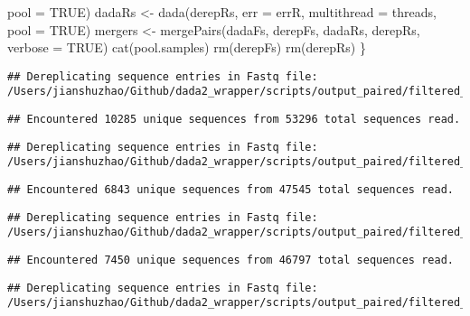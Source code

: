 \documentclass[
]{article}
\newenvironment{Shaded}{\begin{snugshade}}{\end{snugshade}}
\newcommand{\AttributeTok}[1]{\textcolor[rgb]{0.77,0.63,0.00}{#1}}
\newcommand{\ConstantTok}[1]{\textcolor[rgb]{0.00,0.00,0.00}{#1}}
\newcommand{\FunctionTok}[1]{\textcolor[rgb]{0.00,0.00,0.00}{#1}}
\newcommand{\NormalTok}[1]{#1}
\newcommand{\OtherTok}[1]{\textcolor[rgb]{0.56,0.35,0.01}{#1}}
\begin{document}
\begin{Shaded}
\begin{Highlighting}[]
        \AttributeTok{pool =} \ConstantTok{TRUE}\NormalTok{)}
\NormalTok{    dadaRs }\OtherTok{\textless{}{-}} \FunctionTok{dada}\NormalTok{(derepRs, }\AttributeTok{err =}\NormalTok{ errR, }\AttributeTok{multithread =}\NormalTok{ threads, }
        \AttributeTok{pool =} \ConstantTok{TRUE}\NormalTok{)}
\NormalTok{    mergers }\OtherTok{\textless{}{-}} \FunctionTok{mergePairs}\NormalTok{(dadaFs, derepFs, dadaRs, derepRs, }\AttributeTok{verbose =} \ConstantTok{TRUE}\NormalTok{)}
    \FunctionTok{cat}\NormalTok{(pool.samples)}
    \FunctionTok{rm}\NormalTok{(derepFs)}
    \FunctionTok{rm}\NormalTok{(derepRs)}
\NormalTok{\}}
\end{Highlighting}
\end{Shaded}

\begin{verbatim}
## Dereplicating sequence entries in Fastq file: /Users/jianshuzhao/Github/dada2_wrapper/scripts/output_paired/filtered_input/Orwoll_BI0023_BI_F_filt.fastq.gz
\end{verbatim}

\begin{verbatim}
## Encountered 10285 unique sequences from 53296 total sequences read.
\end{verbatim}

\begin{verbatim}
## Dereplicating sequence entries in Fastq file: /Users/jianshuzhao/Github/dada2_wrapper/scripts/output_paired/filtered_input/Orwoll_BI0056_BI_F_filt.fastq.gz
\end{verbatim}

\begin{verbatim}
## Encountered 6843 unique sequences from 47545 total sequences read.
\end{verbatim}

\begin{verbatim}
## Dereplicating sequence entries in Fastq file: /Users/jianshuzhao/Github/dada2_wrapper/scripts/output_paired/filtered_input/Orwoll_BI0131_BI_F_filt.fastq.gz
\end{verbatim}

\begin{verbatim}
## Encountered 7450 unique sequences from 46797 total sequences read.
\end{verbatim}

\begin{verbatim}
## Dereplicating sequence entries in Fastq file: /Users/jianshuzhao/Github/dada2_wrapper/scripts/output_paired/filtered_input/Orwoll_BI0153_BI_F_filt.fastq.gz
\end{verbatim}
\end{document}
